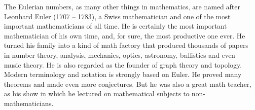 \documentclass{scrreprt}
\begin{document}
The Eulerian numbers, as many other things in mathematics,
are named after Leonhard Euler (1707 -- 1783),
a Swiss mathematician and one of the most important
mathematicians of all time.
He is certainly the most important mathematician of his own time,
and, for sure, the most productive one ever.
He turned his family into a kind of math factory
that produced thousands of papers in 
number theory, analysis, mechanics, optics,
astronomy, ballistics and even music theory.
He is also regarded as the founder of graph theory
and topology.
Modern terminology and notation is strongly based
on Euler. He proved many theorems and 
made even more conjectures.
But he was also a great math teacher,
as his 
show in which he lectured on mathematical subjects
to non-mathematicians.
\end{document}
